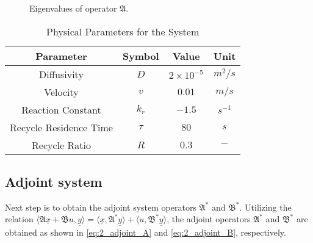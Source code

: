 \begin{figure}[!htbp]
    \centering
    
    \caption{Eigenvalues of operator $\mathfrak{A}$.}
    \label{fig:2_eigval_dist}
\end{figure}


\begin{table}[ht]
    \centering
    \caption{Physical Parameters for the System}
    \label{tab:2_pars}
    \begin{tabular}{|c|c|c|c|}
    \hline
    \textbf{Parameter}        & \textbf{Symbol} & \textbf{Value}     & \textbf{Unit}    \\ \hline
    Diffusivity               & $D$             & $2\times10^{-5}$   & ${m^2}/{s}$      \\ \hline
    Velocity                  & $v$             & $0.01$   & ${m}/{s}$        \\ \hline
    Reaction Constant         & $k_r$           & $-1.5$             & $s^{-1}$         \\ \hline
    Recycle Residence Time    & $\tau$          & $80$               & $s$              \\ \hline
    Recycle Ratio             & $R$             & $0.3$              & $-$              \\ \hline
    \end{tabular}
\end{table}

\subsection{Adjoint system}

Next step is to obtain the adjoint system operators $\mathfrak{A}^*$ and $\mathfrak{B}^*$. Utilizing the relation $\langle \mathfrak{A} \underline{x} + \mathfrak{B} u, \underline{y}\rangle = \langle \underline{x}, \mathfrak{A}^* \underline{y}\rangle + \langle u, \mathfrak{B}^* \underline{y}\rangle$, the adjoint operators $\mathfrak{A}^*$ and $\mathfrak{B}^*$ are obtained as shown in \eqref{eq:2_adjoint_A} and \eqref{eq:2_adjoint_B}, respectively.


